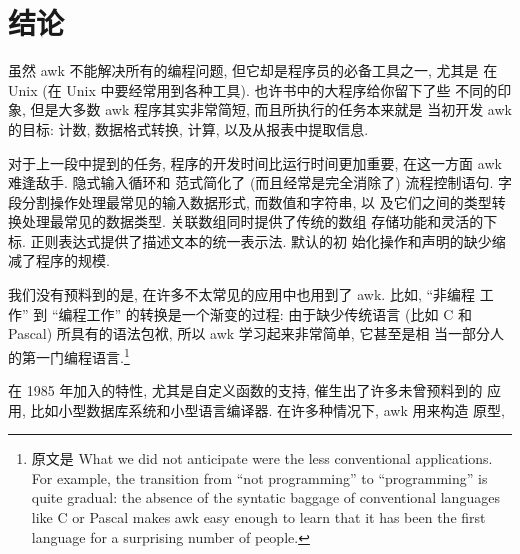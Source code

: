 \section{结论}
\label{sec:conclusion}
虽然 awk 不能解决所有的编程问题, 但它却是程序员的必备工具之一, 尤其是
在 Unix (在 Unix 中要经常用到各种工具). 也许书中的大程序给你留下了些
不同的印象, 但是大多数 awk 程序其实非常简短, 而且所执行的任务本来就是
当初开发 awk 的目标: 计数, 数据格式转换, 计算, 以及从报表中提取信息.

对于上一段中提到的任务, 程序的开发时间比运行时间更加重要, 在这一方面
awk 难逢敌手. 隐式输入循环和 \patact 范式简化了 (而且经常是完全消除了)
流程控制语句. 字段分割操作处理最常见的输入数据形式, 而数值和字符串, 以
及它们之间的类型转换处理最常见的数据类型. 关联数组同时提供了传统的数组
存储功能和灵活的下标. 正则表达式提供了描述文本的统一表示法. 默认的初
始化操作和声明的缺少缩减了程序的规模.

我们没有预料到的是,  在许多不太常见的应用中也用到了 awk. 比如, ``非编程
工作'' 到 ``编程工作'' 的转换是一个渐变的过程: 由于缺少传统语言 (比如 
C 和 Pascal) 所具有的语法包袱, 所以 awk 学习起来非常简单, 它甚至是相
当一部分人的第一门编程语言.\footnote{原文是 What we did not anticipate were
    the less conventional applications. For example, the transition from
    ``not programming'' to ``programming'' is quite gradual: the absence of
    the syntatic baggage of conventional languages like C or Pascal makes
    awk easy enough to learn that it has been the first language for a
surprising number of people.}

在 1985 年加入的特性, 尤其是自定义函数的支持, 催生出了许多未曾预料到的
应用, 比如小型数据库系统和小型语言编译器. 在许多种情况下, awk 用来构造
原型,
